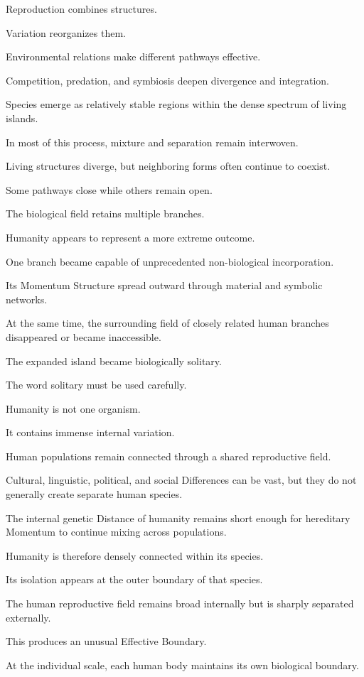 Reproduction combines structures.

Variation reorganizes them.

Environmental relations make different pathways effective.

Competition, predation, and symbiosis deepen divergence and integration.

Species emerge as relatively stable regions within the dense spectrum of living islands.

In most of this process, mixture and separation remain interwoven.

Living structures diverge, but neighboring forms often continue to coexist.

Some pathways close while others remain open.

The biological field retains multiple branches.

Humanity appears to represent a more extreme outcome.

One branch became capable of unprecedented non-biological incorporation.

Its Momentum Structure spread outward through material and symbolic networks.

At the same time, the surrounding field of closely related human branches disappeared or became inaccessible.

The expanded island became biologically solitary.

The word solitary must be used carefully.

Humanity is not one organism.

It contains immense internal variation.

Human populations remain connected through a shared reproductive field.

Cultural, linguistic, political, and social Differences can be vast, but they do not generally create separate human species.

The internal genetic Distance of humanity remains short enough for hereditary Momentum to continue mixing across populations.

Humanity is therefore densely connected within its species.

Its isolation appears at the outer boundary of that species.

The human reproductive field remains broad internally but is sharply separated externally.

This produces an unusual Effective Boundary.

At the individual scale, each human body maintains its own biological boundary.

